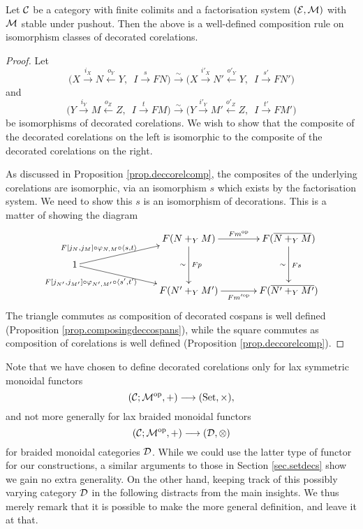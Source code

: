 \begin{proposition} \label{prop.deccorelcomp}
  Let $\mathcal C$ be a category with finite colimits and a factorisation system
  $(\mathcal E,\mathcal M)$ with $\mathcal M$ stable under pushout. Then the above is a
  well-defined composition rule on isomorphism classes of decorated corelations.
\end{proposition}
\begin{proof}
Let 
\[
  \big(X \stackrel{i_X}\longrightarrow N \stackrel{o_Y}\longleftarrow Y,\enspace I
\stackrel{s}\longrightarrow FN\big) \stackrel\sim\longrightarrow \big(X \stackrel{i'_X}\longrightarrow N'
\stackrel{o'_Y}\longleftarrow Y,\enspace I \stackrel{s'}\longrightarrow FN'\big)
\]
and
\[
  \big(Y \stackrel{i_Y}\longrightarrow M \stackrel{o_Z}\longleftarrow Z,\enspace I
\stackrel{t}\longrightarrow FM\big) \stackrel\sim\longrightarrow \big(Y \stackrel{i'_Y}\longrightarrow M'
\stackrel{o'_Z}\longleftarrow Z,\enspace I \stackrel{t'}\longrightarrow FM'\big)
\]
be isomorphisms of decorated corelations. We wish to show that the composite of the
decorated corelations on the left is isomorphic to the composite of the decorated
corelations on the right. 

As discussed in Proposition \ref{prop.deccorelcomp}, the composites of the
underlying corelations are isomorphic, via an isomorphism $s$ which exists by the
factorisation system. We need to show this $s$ is an isomorphism of decorations.
This is a matter of showing the diagram 
\[
    \xymatrixcolsep{3pc}
    \xymatrixrowsep{1pc}
 \xymatrix{
   && F(N+_YM) \ar[r]^{Fm^\opp} \ar[dd]_\sim^{Fp} & F(\overline{N+_YM})
   \ar[dd]_\sim^{Fs} \\
   1 \ar[urr]^(.4){F[j_N,j_M]\circ\varphi_{N,M}\circ \langle s,t \rangle\qquad}
   \ar[drr]_(.4){F[j_{N'},j_{M'}]\circ\varphi_{N',M'}\circ \langle s',t'
 \rangle\qquad\quad} \\
   && F(N'+_YM') \ar[r]_{Fm'^\opp} & F(\overline{N'+_YM'})\\
 }
\]
The triangle commutes as composition of decorated cospans is well defined
(Proposition \ref{prop.composingdeccospans}), while the square commutes as
composition of corelations is well defined (Proposition
\ref{prop.deccorelcomp}).
\end{proof}

\begin{remark}
  Note that we have chosen to define decorated corelations only for lax symmetric
  monoidal functors 
  \[
    (\mathcal C;\mathcal M^{\mathrm{op}},+) \longrightarrow (\mathrm{Set}, \times),
  \]
  and not more generally for lax braided monoidal functors 
  \[
    (\mathcal C;\mathcal M^{\mathrm{op}},+) \longrightarrow (\mathcal D, \otimes)
  \]
  for braided monoidal categories $\mathcal D$. While we could use the latter type of
  functor for our constructions, a similar arguments to those in Section
  \ref{sec.setdecs} show we gain no extra generality. On the other hand, keeping
  track of this possibly varying category $\mathcal D$ in the following distracts
  from the main insights. We thus merely remark that it is possible to make the
  more general definition, and leave it at that.
\end{remark}

